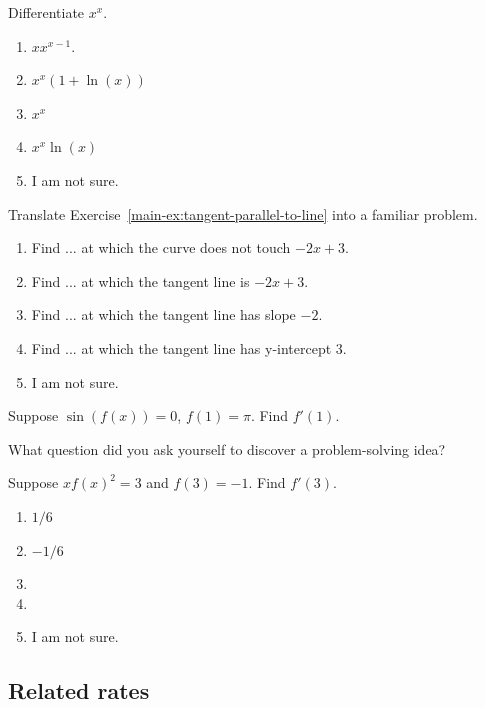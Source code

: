 \documentclass[aspectratio=169, 14pt, t]{beamer}  %
\begin{document}
\begin{poll}
  Differentiate \(x^{x}\).

  \begin{enumerate}
    \item \(x x^{x-1}\).
    \item \(x^{x}(1 + \ln(x))\)
    \item \(x^{x}\)
    \item \(x^{x}\ln(x)\)
    \item I am not sure.
  \end{enumerate}
\end{poll}

\begin{poll}
  Translate Exercise~\ref{main-ex:tangent-parallel-to-line} into a familiar problem.

  \begin{enumerate}
    \item Find ... at which the curve does not touch \(-2x + 3\).
    \item Find ... at which the tangent line is \(-2x + 3\).
    \item Find ... at which the tangent line has slope \(-2\).
    \item Find ... at which the tangent line has y-intercept \(3\).
    \item I am not sure.
  \end{enumerate}
\end{poll}

\begin{poll}
  Suppose \(\sin(f(x)) = 0\), \(f(1) = \pi\). Find \(f'(1)\).

  What question did you ask yourself to discover a problem-solving idea?
\end{poll}

\begin{poll}
  Suppose \(x f(x)^{2} = 3\) and \(f(3) = -1\). Find \(f'(3)\).

  \begin{enumerate}
    \item \(1/6\)
    \item \(-1/6\)
    \item
    \item
    \item I am not sure.
  \end{enumerate}
\end{poll}

\subsection{Related rates}
\end{document}
